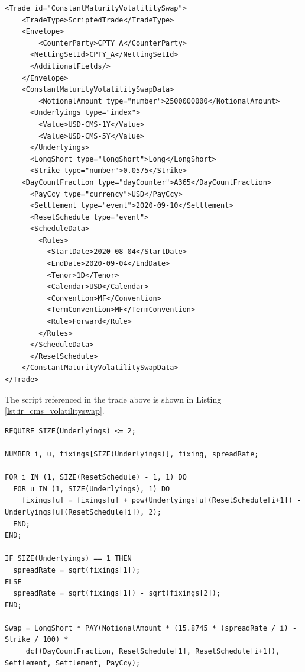 \begin{verbatim}
<Trade id="ConstantMaturityVolatilitySwap">
    <TradeType>ScriptedTrade</TradeType>
    <Envelope>
        <CounterParty>CPTY_A</CounterParty>
      <NettingSetId>CPTY_A</NettingSetId>
      <AdditionalFields/>
    </Envelope>
    <ConstantMaturityVolatilitySwapData>
        <NotionalAmount type="number">2500000000</NotionalAmount>
      <Underlyings type="index">
        <Value>USD-CMS-1Y</Value>
        <Value>USD-CMS-5Y</Value>
      </Underlyings>
      <LongShort type="longShort">Long</LongShort>
      <Strike type="number">0.0575</Strike>
    <DayCountFraction type="dayCounter">A365</DayCountFraction>
      <PayCcy type="currency">USD</PayCcy>
      <Settlement type="event">2020-09-10</Settlement>
      <ResetSchedule type="event">
      <ScheduleData>
        <Rules>
          <StartDate>2020-08-04</StartDate>
          <EndDate>2020-09-04</EndDate>
          <Tenor>1D</Tenor>
          <Calendar>USD</Calendar>
          <Convention>MF</Convention>
          <TermConvention>MF</TermConvention>
          <Rule>Forward</Rule>
        </Rules>
      </ScheduleData>
      </ResetSchedule>
    </ConstantMaturityVolatilitySwapData>
</Trade>

\end{verbatim}

The script referenced in the trade above is shown in Listing \ref{lst:ir_cms_volatilityswap}.

\begin{listing}[hbt]
\begin{verbatim}
REQUIRE SIZE(Underlyings) <= 2;

NUMBER i, u, fixings[SIZE(Underlyings)], fixing, spreadRate;

FOR i IN (1, SIZE(ResetSchedule) - 1, 1) DO
  FOR u IN (1, SIZE(Underlyings), 1) DO
    fixings[u] = fixings[u] + pow(Underlyings[u](ResetSchedule[i+1]) - Underlyings[u](ResetSchedule[i]), 2);
  END;
END;

IF SIZE(Underlyings) == 1 THEN
  spreadRate = sqrt(fixings[1]);
ELSE
  spreadRate = sqrt(fixings[1]) - sqrt(fixings[2]);
END;

Swap = LongShort * PAY(NotionalAmount * (15.8745 * (spreadRate / i) - Strike / 100) *
     dcf(DayCountFraction, ResetSchedule[1], ResetSchedule[i+1]), Settlement, Settlement, PayCcy);
\end{verbatim}
\caption{Payoff script for a CMS Volatility Swap.}
\label{lst:ir_cms_volatilityswap}
\end{listing}

